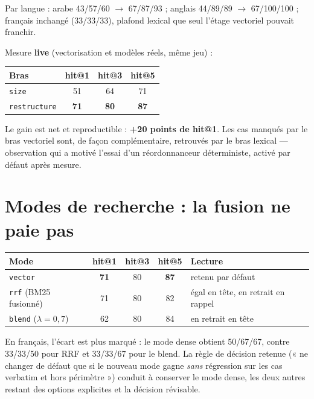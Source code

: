 \documentclass[a4paper,12pt]{report}
\begin{document}
Par langue : arabe 43/57/60 $\rightarrow$ 67/87/93 ; anglais 44/89/89 $\rightarrow$ 67/100/100 ;
français inchangé (33/33/33), plafond lexical que seul l'étage vectoriel pouvait franchir.

Mesure \textbf{live} (vectorisation et modèles réels, même jeu) :

\begin{table}[H]
\centering
\begin{tabular}{lccc}
\toprule
\textbf{Bras} & \textbf{hit@1} & \textbf{hit@3} & \textbf{hit@5} \\
\midrule
\texttt{size} & 51 & 64 & 71 \\
\texttt{restructure} & \textbf{71} & \textbf{80} & \textbf{87} \\
\bottomrule
\end{tabular}
\end{table}

Le gain est net et reproductible : \textbf{+20 points de hit@1}. Les cas manqués par le bras
vectoriel sont, de façon complémentaire, retrouvés par le bras lexical — observation qui a motivé
l'essai d'un réordonnanceur déterministe, activé par défaut après mesure.

\section{Modes de recherche : la fusion ne paie pas}
\begin{table}[H]
\centering
\small
\begin{tabular}{lcccl}
\toprule
\textbf{Mode} & \textbf{hit@1} & \textbf{hit@3} & \textbf{hit@5} & \textbf{Lecture} \\
\midrule
\texttt{vector} & \textbf{71} & 80 & \textbf{87} & retenu par défaut \\
\texttt{rrf} (BM25 fusionné) & 71 & 80 & 82 & égal en tête, en retrait en rappel \\
\texttt{blend} ($\lambda = 0{,}7$) & 62 & 80 & 84 & en retrait en tête \\
\bottomrule
\end{tabular}
\end{table}

En français, l'écart est plus marqué : le mode dense obtient 50/67/67, contre 33/33/50 pour RRF et
33/33/67 pour le blend. La règle de décision retenue (« ne changer de défaut que si le nouveau mode
gagne \emph{sans} régression sur les cas verbatim et hors périmètre ») conduit à conserver le mode
dense, les deux autres restant des options explicites et la décision révisable.
\end{document}
